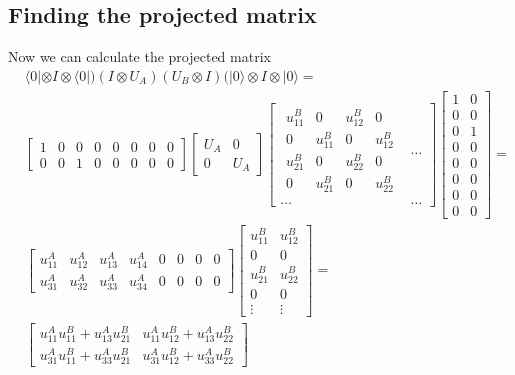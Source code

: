 \documentclass[11pt]{article}
\begin{document}
\newpage
\subsection*{Finding the projected matrix}
Now we can calculate the projected matrix
\begin{align*}
&\langle 0| \otimes I \otimes \langle 0|) (I \otimes U_A) (U_B \otimes I) (|0\rangle \otimes I \otimes |0\rangle = \\ 
&\begin{bmatrix} 1 & 0 & 0 & 0 & 0 & 0 & 0 & 0 \\ 0 & 0 & 1 & 0 & 0 & 0 & 0 & 0 \end{bmatrix}
\begin{bmatrix} U_A & 0 \\ 0 & U_A \end{bmatrix}
\left[ \begin{array}{c|c} 
\begin{matrix} 
	u^B_{11} & 0 & u^B_{12} & 0 \\ 
	0 & u^B_{11} & 0 & u^B_{12} \\ 
	u^B_{21} & 0 & u^B_{22} & 0 \\ 
	0 & u^B_{21} & 0 & u^B_{22} 
\end{matrix}  & \dots \\ \hline \dots & \dots 
\end{array} \right]
\begin{bmatrix} 1 & 0 \\ 0 & 0 \\ 0 & 1 \\ 0 & 0 \\ 0 & 0 \\ 0 & 0 \\ 0 & 0 \\ 0 & 0 \end{bmatrix} = \\
&\begin{bmatrix} 
u^A_{11} & u^A_{12} & u^A_{13} & u^A_{14} & 0 & 0 & 0 & 0 \\
u^A_{31} & u^A_{32} & u^A_{33} & u^A_{34} & 0 & 0 & 0 & 0 
\end{bmatrix}
\begin{bmatrix}
u^B_{11} & u^B_{12} \\
0 & 0 \\ 
u^B_{21} & u^B_{22} \\
0 & 0 \\
\vdots & \vdots 
\end{bmatrix} = \\
&\begin{bmatrix}
u^A_{11}u^B_{11} + u^A_{13}u^B_{21} & u^A_{11}u^B_{12} + u^A_{13}u^B_{22} \\
u^A_{31}u^B_{11} + u^A_{33}u^B_{21} & u^A_{31}u^B_{12} + u^A_{33}u^B_{22}
\end{bmatrix} \\
\end{align*}
\end{document}
